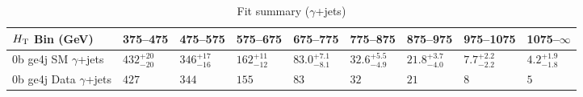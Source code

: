 \documentclass[8pt]{article}
\def\scalht{\mbox{$H_{\rm{T}}$}\xspace}
\newcommand\T{\rule{0pt}{2.6ex}}
\begin{document}
\begin{table}[ht!]
\caption{Fit summary ($\gamma$+jets)}
\label{tab:ensemble-summary}
\centering
\begin{tabular}{ lllllllll }

\hline
\scalht Bin (GeV)       & 375--475                       & 475--575                       & 575--675                       & 675--775                       & 775--875                       & 875--975                       & 975--1075                      & 1075--$\infty$                 \\ [1.000000ex]
\hline
0b ge4j SM $\gamma$+jets\T & $432^{+20}_{-20}$              & $346^{+17}_{-16}$              & $162^{+11}_{-12}$              & $83.0^{+7.1}_{-8.1}$           & $32.6^{+5.5}_{-4.9}$           & $21.8^{+3.7}_{-4.0}$           & $7.7^{+2.2}_{-2.2}$            & $4.2^{+1.9}_{-1.8}$            \\ 
0b ge4j Data $\gamma$+jets\T & $427$                          & $344$                          & $155$                          & $83$                           & $32$                           & $21$                           & $8$                            & $5$                            \\ 
\hline

\end{tabular}
\end{table}
\end{document}
